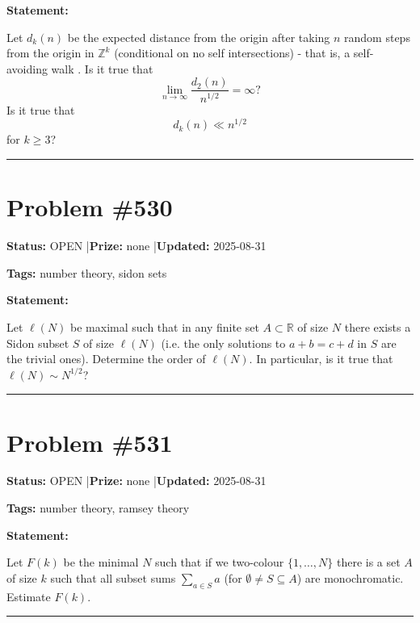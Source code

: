 \documentclass{article}
\begin{document}
\medskip

\noindent\textbf{Statement:}

Let $d_k(n)$ be the expected distance from the origin after taking $n$ random steps from the origin in $\mathbb{Z}^k$ (conditional on no self intersections) - that is, a self-avoiding walk . Is it true that\[\lim_{n\to \infty}\frac{d_2(n)}{n^{1/2}}= \infty?\]Is it true that\[d_k(n)\ll n^{1/2}\]for $k\geq 3$?

\noindent\rule{\linewidth}{0.4pt}


\section{Problem \#530}
\label{prob:530}

\noindent\textbf{Status:} OPEN \quad|\quad \textbf{Prize:} none \quad|\quad \textbf{Updated:} 2025-08-31

\noindent\textbf{Tags:} number theory, sidon sets

\medskip

\noindent\textbf{Statement:}

Let $\ell(N)$ be maximal such that in any finite set $A\subset \mathbb{R}$ of size $N$ there exists a Sidon subset $S$ of size $\ell(N)$ (i.e. the only solutions to $a+b=c+d$ in $S$ are the trivial ones). Determine the order of $\ell(N)$. In particular, is it true that $\ell(N)\sim N^{1/2}$?

\noindent\rule{\linewidth}{0.4pt}


\section{Problem \#531}
\label{prob:531}

\noindent\textbf{Status:} OPEN \quad|\quad \textbf{Prize:} none \quad|\quad \textbf{Updated:} 2025-08-31

\noindent\textbf{Tags:} number theory, ramsey theory

\medskip

\noindent\textbf{Statement:}

Let $F(k)$ be the minimal $N$ such that if we two-colour $\{1,\ldots,N\}$ there is a set $A$ of size $k$ such that all subset sums $\sum_{a\in S}a$ (for $\emptyset\neq S\subseteq A$) are monochromatic. Estimate $F(k)$.

\noindent\rule{\linewidth}{0.4pt}
\end{document}
